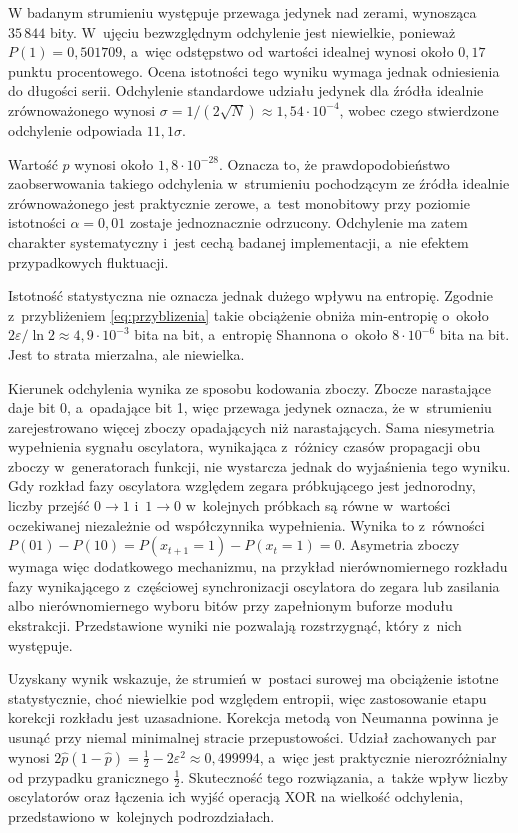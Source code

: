 W badanym strumieniu występuje przewaga jedynek nad zerami, wynosząca $35\,844$
bity. W~ujęciu bezwzględnym odchylenie jest niewielkie, ponieważ
$P(1) = 0{,}501709$, a~więc odstępstwo od wartości idealnej wynosi około $0{,}17$
punktu procentowego. Ocena istotności tego wyniku wymaga jednak odniesienia do
długości serii. Odchylenie standardowe udziału jedynek dla źródła idealnie
zrównoważonego wynosi $\sigma = 1/(2\sqrt{N}) \approx 1{,}54 \cdot 10^{-4}$,
wobec czego stwierdzone odchylenie odpowiada $11{,}1\sigma$.

Wartość $p$ wynosi około $1{,}8 \cdot 10^{-28}$. Oznacza to, że prawdopodobieństwo
zaobserwowania takiego odchylenia w~strumieniu pochodzącym ze źródła idealnie
zrównoważonego jest praktycznie zerowe, a~test monobitowy przy poziomie
istotności $\alpha = 0{,}01$ zostaje jednoznacznie odrzucony. Odchylenie ma zatem
charakter systematyczny i~jest cechą badanej implementacji, a~nie efektem
przypadkowych fluktuacji.

Istotność statystyczna nie oznacza jednak dużego wpływu na entropię. Zgodnie
z~przybliżeniem \eqref{eq:przyblizenia} takie obciążenie obniża min-entropię
o~około $2\varepsilon/\ln 2 \approx 4{,}9 \cdot 10^{-3}$ bita na bit, a~entropię
Shannona o~około $8 \cdot 10^{-6}$ bita na bit. Jest to strata mierzalna, ale
niewielka.

Kierunek odchylenia wynika ze sposobu kodowania zboczy. Zbocze narastające daje
bit 0, a~opadające bit 1, więc przewaga jedynek oznacza, że w~strumieniu
zarejestrowano więcej zboczy opadających niż narastających. Sama niesymetria
wypełnienia sygnału oscylatora, wynikająca z~różnicy czasów propagacji obu
zboczy w~generatorach funkcji, nie wystarcza jednak do wyjaśnienia tego wyniku.
Gdy rozkład fazy oscylatora względem zegara próbkującego jest jednorodny, liczby
przejść $0 \to 1$ i~$1 \to 0$ w~kolejnych próbkach są równe w~wartości
oczekiwanej niezależnie od współczynnika wypełnienia. Wynika to z~równości
$P(01) - P(10) = P(x_{t+1} = 1) - P(x_t = 1) = 0$. Asymetria zboczy wymaga więc
dodatkowego mechanizmu, na przykład nierównomiernego rozkładu fazy wynikającego
z~częściowej synchronizacji oscylatora do zegara lub zasilania albo
nierównomiernego wyboru bitów przy zapełnionym buforze modułu ekstrakcji.
Przedstawione wyniki nie pozwalają rozstrzygnąć, który z~nich występuje.

Uzyskany wynik wskazuje, że strumień w~postaci surowej ma obciążenie istotne
statystycznie, choć niewielkie pod względem entropii, więc zastosowanie etapu
korekcji rozkładu jest uzasadnione. Korekcja metodą von Neumanna powinna je
usunąć przy niemal minimalnej stracie przepustowości. Udział zachowanych par
wynosi $2\hat{p}(1-\hat{p}) = \tfrac12 - 2\varepsilon^2 \approx 0{,}499994$,
a~więc jest praktycznie nierozróżnialny od przypadku granicznego $\tfrac12$.
Skuteczność tego rozwiązania, a~także wpływ liczby oscylatorów oraz łączenia ich
wyjść operacją XOR na wielkość odchylenia, przedstawiono w~kolejnych
podrozdziałach.

